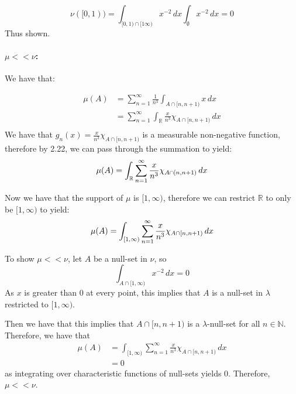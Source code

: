 \documentclass{article}
\theoremstyle{definition}
\numberwithin{theorem}{section}
\numberwithin{equation}{section}
\begin{document}
\begin{equation}
	\nu([0, 1)) = \int_{[0, 1) \cap [1 \infty)} x^{-2} \, dx\int_{\emptyset} x^{-2} \, dx = 0
\end{equation}
Thus shown.

\paragraph{$\mu << \nu$:}
We have that:

\begin{align*}
	\mu(A) &= \sum_{n = 1}^{\infty} \frac{1}{n^3} \int_{A\cap [n, n + 1)} x \, dx \\
	&=\sum_{n = 1}^{\infty} \int_{\mathbb{R}} \frac{x}{n^3} \chi_{A\cap [n, n + 1)} \, dx \\
\end{align*}
We have that $g_n(x) = \frac{x}{n^3} \chi_{A\cap [n, n + 1)}$ is a measurable non-negative function, therefore by 2.22, we can pass through the summation to yield:
\begin{equation}
		\mu(A) = \int_{\mathbb{R}}\sum_{n = 1}^{\infty} \frac{x}{n^3} \chi_{A\cap [n, n + 1)} \, dx \\
\end{equation}

Now we have that the support of $\mu$ is $[1, \infty)$, therefore we can restrict $\mathbb{R}$ to only be $[1, \infty)$ to yield:
\begin{equation}
	\mu(A) = \int_{[1, \infty)}\sum_{n = 1}^{\infty} \frac{x}{n^3} \chi_{A\cap [n, n + 1)} \, dx \\
\end{equation}

To show $\mu << \nu$, let $A$ be a null-set in $\nu$, so
\begin{equation}
	\int_{A \cap [1, \infty)} x^{-2}\, dx = 0
\end{equation}
As $x$ is greater than 0 at every point, this implies that $A$ is a null-set in $\lambda$ restricted to $[1, \infty)$.

Then we have that this implies that $ A \cap [n, n + 1)$ is a $\lambda$-null-set for all $n \in \mathbb{N}$. Therefore, we have that
\begin{align*}
	\mu(A) &= \int_{[1, \infty)}\sum_{n = 1}^{\infty} \frac{x}{n^3} \chi_{A\cap [n, n + 1)} \, dx \\
	&= 0
\end{align*}
as integrating over characteristic functions of null-sets yields 0.
Therefore, $\mu << \nu$. 
\end{document}
